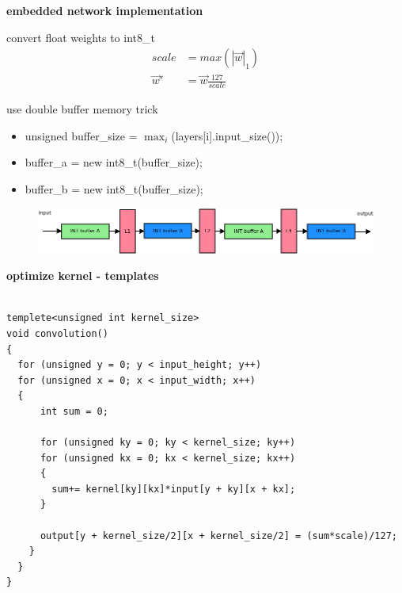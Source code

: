\documentclass[xcolor=dvipsnames]{beamer}
\begin{document}
\begin{frame}{\bf embedded network implementation}

convert float weights to int8\_t
\begin{align*}
  scale &= max{(|\vec{w}|_1)} \\
  \vec{w}' &= \vec{w}\frac{127}{scale}
\end{align*}


use double buffer memory trick

\begin{itemize}
  \item unsigned buffer\_size = $\max_{i}$(layers[i].input\_size());
  \item buffer\_a = new int8\_t(buffer\_size);
  \item buffer\_b = new int8\_t(buffer\_size);
\end{itemize}

\begin{figure}
  \includegraphics[scale=0.3]{../images/nn_memory.png}
\end{figure}

\end{frame}


\begin{frame}[fragile]
{\bf optimize kernel - templates}


\begin{lstlisting}

templete<unsigned int kernel_size>
void convolution()
{
  for (unsigned y = 0; y < input_height; y++)
  for (unsigned x = 0; x < input_width; x++)
  {
      int sum = 0;

      for (unsigned ky = 0; ky < kernel_size; ky++)
      for (unsigned kx = 0; kx < kernel_size; kx++)
      {
        sum+= kernel[ky][kx]*input[y + ky][x + kx];
      }

      output[y + kernel_size/2][x + kernel_size/2] = (sum*scale)/127;
    }
  }
}
\end{lstlisting}
\end{frame}
\end{document}

